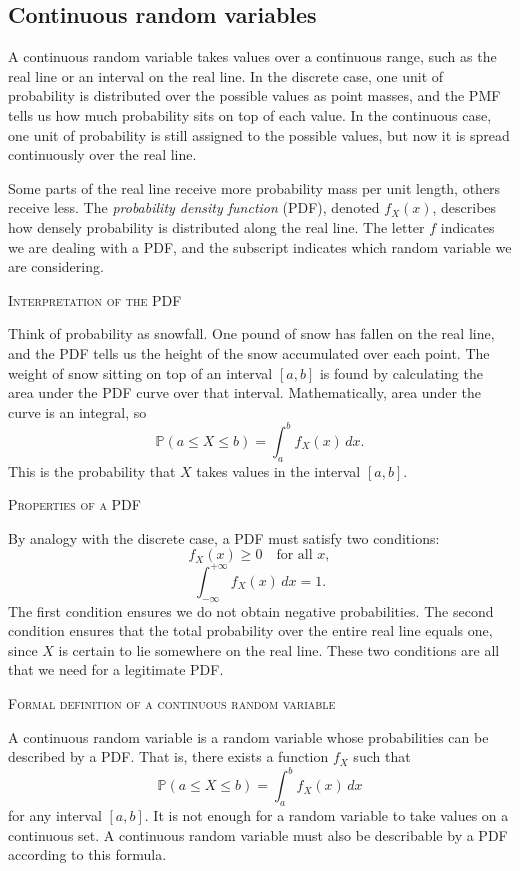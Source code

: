\subsection{Continuous random variables}

A continuous random variable takes values over a continuous range, such as the real line or an interval on the real line.  
In the discrete case, one unit of probability is distributed over the possible values as point masses, and the PMF tells us how much probability sits on top of each value.  
In the continuous case, one unit of probability is still assigned to the possible values, but now it is spread continuously over the real line.

Some parts of the real line receive more probability mass per unit length, others receive less.  
The \textit{probability density function} (PDF), denoted \(f_X(x)\), describes how densely probability is distributed along the real line.  
The letter \(f\) indicates we are dealing with a PDF, and the subscript indicates which random variable we are considering.

\bigskip\textsc{Interpretation of the PDF}

Think of probability as snowfall.  
One pound of snow has fallen on the real line, and the PDF tells us the height of the snow accumulated over each point.  
The weight of snow sitting on top of an interval \([a, b]\) is found by calculating the area under the PDF curve over that interval.  
Mathematically, area under the curve is an integral, so
\[
\mathbb{P}(a \le X \le b) = \int_a^b f_X(x) \, dx.
\]
This is the probability that \(X\) takes values in the interval \([a, b]\).

\bigskip\textsc{Properties of a PDF}

By analogy with the discrete case, a PDF must satisfy two conditions:
\[
f_X(x) \ge 0 \quad \text{for all } x,
\]
\[
\int_{-\infty}^{+\infty} f_X(x) \, dx = 1.
\]
The first condition ensures we do not obtain negative probabilities.  
The second condition ensures that the total probability over the entire real line equals one, since \(X\) is certain to lie somewhere on the real line.  
These two conditions are all that we need for a legitimate PDF.

\bigskip\textsc{Formal definition of a continuous random variable}

A continuous random variable is a random variable whose probabilities can be described by a PDF.  
That is, there exists a function \(f_X\) such that
\[
\mathbb{P}(a \le X \le b) = \int_a^b f_X(x) \, dx
\]
for any interval \([a, b]\).  
It is not enough for a random variable to take values on a continuous set.  
A continuous random variable must also be describable by a PDF according to this formula.

